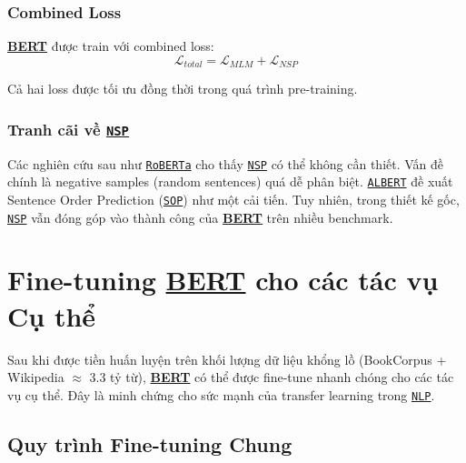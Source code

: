     \subsubsection{Combined Loss}
    \hyperref[acro:bert]{\textbf{BERT}} được train với combined loss:
    \begin{equation}
    \mathcal{L}_{total} = \mathcal{L}_{MLM} + \mathcal{L}_{NSP}
    \label{eq:combined_loss}
    \end{equation}
    
    Cả hai loss được tối ưu đồng thời trong quá trình pre-training.
    
    \subsubsection{Tranh cãi về \hyperref[acro:nsp]{\texttt{NSP}}}
    Các nghiên cứu sau như \hyperref[acro:roberta]{\texttt{RoBERTa}} \cite{liu2019roberta} cho thấy \hyperref[acro:nsp]{\texttt{NSP}} có thể không cần thiết. Vấn đề chính là negative samples (random sentences) quá dễ phân biệt. \hyperref[acro:albert]{\texttt{ALBERT}} \cite{lan2019albert} đề xuất Sentence Order Prediction (\hyperref[acro:sop]{\texttt{SOP}}) như một cải tiến. Tuy nhiên, trong thiết kế gốc, \hyperref[acro:nsp]{\texttt{NSP}} vẫn đóng góp vào thành công của \hyperref[acro:bert]{\textbf{BERT}} trên nhiều benchmark.
    
    \section{Fine-tuning \hyperref[acro:bert]{\textbf{BERT}} cho các tác vụ Cụ thể}
    \label{sec:fine_tuning_bert}
    
    Sau khi được tiền huấn luyện trên khối lượng dữ liệu khổng lồ (BookCorpus + Wikipedia $\approx$ 3.3 tỷ từ), \hyperref[acro:bert]{\textbf{BERT}} có thể được fine-tune nhanh chóng cho các tác vụ cụ thể. Đây là minh chứng cho sức mạnh của transfer learning trong \hyperref[acro:nlp]{\texttt{NLP}}.
    
    \subsection{Quy trình Fine-tuning Chung}
    \label{ssec:quy_trinh_tinh_chinh}
    
